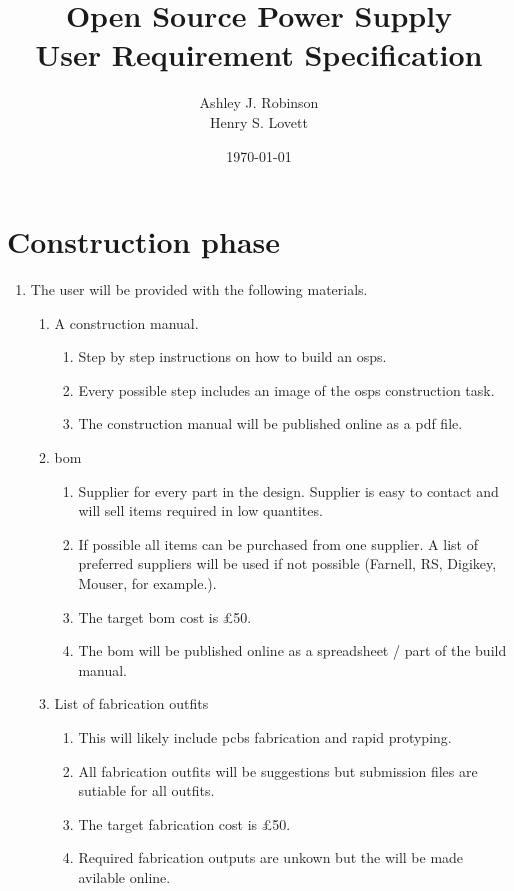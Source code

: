 \documentclass[12pt,a4paper]{article}
\title{Open Source Power Supply\\ User Requirement Specification}
\author{Ashley J. Robinson \\ Henry S. Lovett}
\date{\today}
\begin{document}
\maketitle



\section{Construction phase}
\begin{enumerate}[label*=\arabic*.]
\item The user will be provided with the following materials.
	\begin{enumerate}[label*=\arabic*.]
	\item A construction manual.
		\begin{enumerate}[label*=\arabic*.]
		\item Step by step instructions on how to build an \gls{osps}.
		\item Every possible step includes an image of the \gls{osps} construction task. 
		\item The construction manual will be published online as a pdf file.
		\end{enumerate}
	\item \gls{bom}
		\begin{enumerate}[label*=\arabic*.]
		\item Supplier for every part in the design. Supplier is easy to contact and will sell items required in low quantites.
		\item If possible all items can be purchased from one supplier. A list of preferred suppliers will be used if not possible (Farnell, RS, Digikey, Mouser, for example.).
		\item The target \gls{bom} cost is \pounds50.
		\item The \gls{bom} will be published online as a spreadsheet / part of the build manual.
		\end{enumerate}
	\item List of fabrication outfits
		\begin{enumerate}[label*=\arabic*.]
		\item This will likely include \glspl{pcb} fabrication and rapid protyping.
		\item All fabrication outfits will be suggestions but submission files are sutiable for all outfits.
		\item The target fabrication cost is \pounds50.
		\item Required fabrication outputs are unkown but the will be made avilable online.

\end{enumerate}
\end{enumerate}
\end{enumerate}
\end{document}
